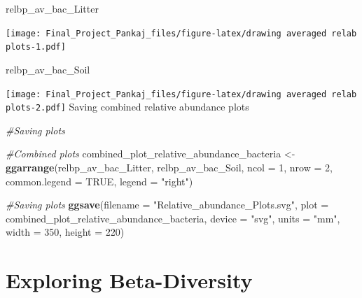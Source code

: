 \documentclass[
]{article}
\newenvironment{Shaded}{\begin{snugshade}}{\end{snugshade}}
\newcommand{\AttributeTok}[1]{\textcolor[rgb]{0.13,0.29,0.53}{#1}}
\newcommand{\CommentTok}[1]{\textcolor[rgb]{0.56,0.35,0.01}{\textit{#1}}}
\newcommand{\ConstantTok}[1]{\textcolor[rgb]{0.56,0.35,0.01}{#1}}
\newcommand{\DecValTok}[1]{\textcolor[rgb]{0.00,0.00,0.81}{#1}}
\newcommand{\FunctionTok}[1]{\textcolor[rgb]{0.13,0.29,0.53}{\textbf{#1}}}
\newcommand{\NormalTok}[1]{#1}
\newcommand{\OtherTok}[1]{\textcolor[rgb]{0.56,0.35,0.01}{#1}}
\newcommand{\StringTok}[1]{\textcolor[rgb]{0.31,0.60,0.02}{#1}}
\begin{document}
\begin{Shaded}
\begin{Highlighting}[]
\NormalTok{relbp\_av\_bac\_Litter}
\end{Highlighting}
\end{Shaded}

\texttt{[image: Final\_Project\_Pankaj\_files/figure-latex/drawing averaged relab plots-1.pdf]}

\begin{Shaded}
\begin{Highlighting}[]
\NormalTok{relbp\_av\_bac\_Soil}
\end{Highlighting}
\end{Shaded}

\texttt{[image: Final\_Project\_Pankaj\_files/figure-latex/drawing averaged relab plots-2.pdf]}
Saving combined relative abundance plots

\begin{Shaded}
\begin{Highlighting}[]
\CommentTok{\#Saving plots}

\CommentTok{\#Combined plots}
\NormalTok{combined\_plot\_relative\_abundance\_bacteria }\OtherTok{\textless{}{-}} \FunctionTok{ggarrange}\NormalTok{(relbp\_av\_bac\_Litter, relbp\_av\_bac\_Soil,}
                           \AttributeTok{ncol =} \DecValTok{1}\NormalTok{,}
                           \AttributeTok{nrow =} \DecValTok{2}\NormalTok{,}
                           \AttributeTok{common.legend =} \ConstantTok{TRUE}\NormalTok{,}
                           \AttributeTok{legend =} \StringTok{"right"}\NormalTok{)}

\CommentTok{\#Saving plots}
\FunctionTok{ggsave}\NormalTok{(}\AttributeTok{filename =} \StringTok{"Relative\_abundance\_Plots.svg"}\NormalTok{,}
       \AttributeTok{plot =}\NormalTok{ combined\_plot\_relative\_abundance\_bacteria,}
       \AttributeTok{device =} \StringTok{"svg"}\NormalTok{,}
       \AttributeTok{units =} \StringTok{"mm"}\NormalTok{,}
       \AttributeTok{width =} \DecValTok{350}\NormalTok{,}
       \AttributeTok{height =} \DecValTok{220}\NormalTok{)}
\end{Highlighting}
\end{Shaded}

\section{\texorpdfstring{\textbf{Exploring
Beta-Diversity}}{Exploring Beta-Diversity}}\label{exploring-beta-diversity}
\end{document}

